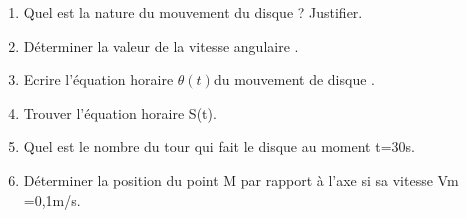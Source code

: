 \documentclass[12pt]{article}
\begin{document}
\begin{enumerate}
\begin{figure}[h]
    \centering
    \qquad
\end{figure}
\item Quel est la nature du mouvement du disque ?
Justifier.
\item Déterminer la valeur de la vitesse angulaire .
\item Ecrire l'équation horaire $\theta(t) $du mouvement de disque .
\item Trouver l'équation horaire S(t).
    \item Quel est le nombre du tour qui fait le disque au
moment t=30s.
\item Déterminer la position du point M par rapport à
l'axe si sa vitesse Vm =0,1m/s.
\end{enumerate}
\end{document}
